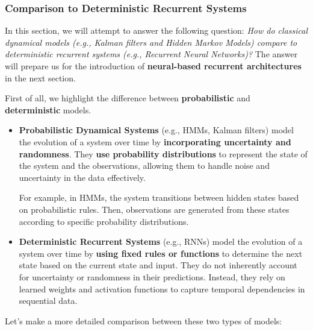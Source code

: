 \subsubsection{Comparison to Deterministic Recurrent Systems}

In this section, we will attempt to answer the following question: \emph{How do classical dynamical models (e.g., Kalman filters and Hidden Markov Models) compare to deterministic recurrent systems (e.g., Recurrent Neural Networks)?} The answer will prepare us for the introduction of \textbf{neural-based recurrent architectures} in the next section.

\highspace
First of all, we highlight the difference between \textbf{probabilistic} and \textbf{deterministic} models.
\begin{itemize}
    \item \textbf{Probabilistic Dynamical Systems} (e.g., HMMs, Kalman filters) model the evolution of a system over time by \textbf{incorporating uncertainty and randomness}. They \textbf{use probability distributions} to represent the state of the system and the observations, allowing them to handle noise and uncertainty in the data effectively.

    For example, in HMMs, the system transitions between hidden states based on probabilistic rules. Then, observations are generated from these states according to specific probability distributions.


    \item \textbf{Deterministic Recurrent Systems} (e.g., RNNs) model the evolution of a system over time by \textbf{using fixed rules or functions} to determine the next state based on the current state and input. They do not inherently account for uncertainty or randomness in their predictions. Instead, they rely on learned weights and activation functions to capture temporal dependencies in sequential data.
\end{itemize}
Let's make a more detailed comparison between these two types of models:
